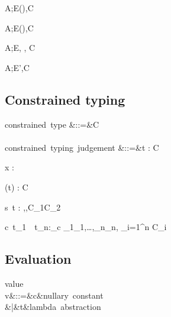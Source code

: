 \documentclass{amsart}
\theoremstyle{definition}
\begin{document}

{A;E\vdash(\All\alpha\sigma)\Sub\tau,C}

{A;E\vdash\sigma\Sub(\All\alpha\tau),C}

{A;E\vdash \sigma\Sub\tau, \sigma\Sub\tau, C}


{A;E\vdash \sigma\Sub\tau',C}

\subsection{Constrained typing}
\begin{syntax}
\mbox{constrained type}
&::=&\tau \Given C
\\\\
\mbox{constrained typing judgement}
&::=&\Gamma \vdash t : \tau \Given C
\end{syntax}%
{\Gamma\vdash x : \tau \Given \emptyset}

{\Gamma\vdash (t) : \sigma\R\tau \Given C}

{\Gamma\vdash s~t : \beta \Given
\sigma\Sub\alpha\R\beta,\tau\Sub\alpha,C_1\cup C_2}

{\Gamma\vdash c~t_1~\cdots~t_n:\iota_c\Given
\tau_1\Sub\iota_1,\ldots,\tau_n\Sub\iota_n,
{\textstyle\bigcup_{i=1}^n C_i}
}

\subsection{Evaluation}

\begin{syntax}
\mbox{value}\\
v&::=&c&\mbox{nullary constant}\\
&|&t&\mbox{lambda abstraction}
\end{syntax}
\end{document}
